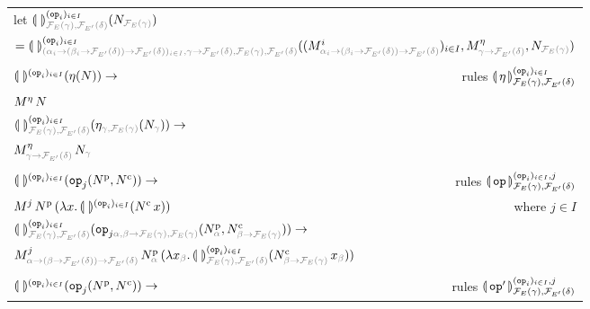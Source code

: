 \begin{figure}
  \centering
  \begin{tabular}{lr}
  let $\banana{}^{(\op{op}_i)_{i \in
    I}}_{\typehint{\FF_E(\gamma),\FF_{E'}(\delta)}}(N_{\typehint{\FF_E(\gamma)}})$ & \\
  \multicolumn{2}{l}{$ = \banana{}^{(\op{op}_i)_{i \in I}}_{\typehint{(\alpha_i \to (\beta_i \to \FF_{E'}(\delta)) \to
  \FF_{E'}(\delta))_{i \in I}, \gamma \to \FF_{E'}(\delta), \FF_E(\gamma),
  \FF_{E'}(\delta)}} ((M^i_{\typehint{\alpha_i \to (\beta_i \to
    \FF_{E'}(\delta)) \to \FF_{E'}(\delta)}})_{i \in I},
    M^\eta_{\typehint{\gamma \to \FF_{E'}(\delta)}}, N_{\typehint{\FF_E(\gamma)}})$} \\
  \\
  $\llparenthesis \,  \, \rrparenthesis^{(\mathtt{op}_i)_{i \in I}} (\eta (N)) \to$ & rules $\llparenthesis \, \eta \, \rrparenthesis^{(\mathtt{op}_i)_{i \in I}}_{\mathcal{F}_E(\gamma),\mathcal{F}_{E'}(\delta)}$ \\
  $M^\eta\,N$ & \\
  \multicolumn{2}{l}{$\banana{}^{(\op{op}_i)_{i \in I}}_{\typehint{\FF_E(\gamma), \FF_{E'}(\delta)}} (\eta_{\typehint{\gamma, \FF_E(\gamma)}} (N_{\typehint{\gamma}})) \to$} \\
  \multicolumn{2}{l}{$\ap{M^\eta_{\typehint{\gamma \to \FF_{E'}(\delta)}}}{N_{\typehint{\gamma}}}$} \\
  \\
  $\llparenthesis \,  \, \rrparenthesis^{(\mathtt{op}_i)_{i \in I}} (\mathtt{op}_j (N^{\mathrm{p}}, N^{\mathrm{c}})) \to$ & rules $\llparenthesis \, \mathtt{op} \, \rrparenthesis^{(\mathtt{op}_i)_{i \in I},j}_{\mathcal{F}_E(\gamma),\mathcal{F}_{E'}(\delta)}$ \\
  $M^j\,N^{\mathrm{p}}\,(\lambda x.\, \llparenthesis \,  \, \rrparenthesis^{(\mathtt{op}_i)_{i \in I}}(N^{\mathrm{c}}\,x))$ & where $j \in I$ \\
  \multicolumn{2}{l}{$\banana{}^{(\op{op}_i)_{i \in I}}_{\typehint{\FF_E(\gamma), \FF_{E'}(\delta)}} (\op{op}_{j \typehint{\alpha, \beta \to \FF_E(\gamma), \FF_E(\gamma)}} (N^{\mathrm{p}}_{\typehint{\alpha}}, N^{\mathrm{c}}_{\typehint{\beta \to \FF_E(\gamma)}})) \to$} \\
  \multicolumn{2}{l}{$\app{M^j_{\typehint{\alpha \to (\beta \to
    \FF_{E'}(\delta)) \to \FF_{E'}(\delta)}}}{N^{\mathrm{p}}_{\typehint{\alpha}}}{(\lam{x_{\typehint{\beta}}}{\banana{}^{(\op{op}_i)_{i \in I}}_{\typehint{\FF_E(\gamma), \FF_{E'}(\delta)}} (\ap{N^{\mathrm{c}}_{\typehint{\beta \to \FF_E(\gamma)}}}{x_{\typehint{\beta}}})})}$} \\
  \\
  $\llparenthesis \,  \, \rrparenthesis^{(\mathtt{op}_i)_{i \in I}} (\mathtt{op}_j (N^{\mathrm{p}}, N^{\mathrm{c}})) \to$ & rules $\llparenthesis \, \mathtt{op}' \, \rrparenthesis^{(\mathtt{op}_i)_{i \in I},j}_{\mathcal{F}_E(\gamma),\mathcal{F}_{E'}(\delta)}$ \\

\end{tabular}
\end{figure}
